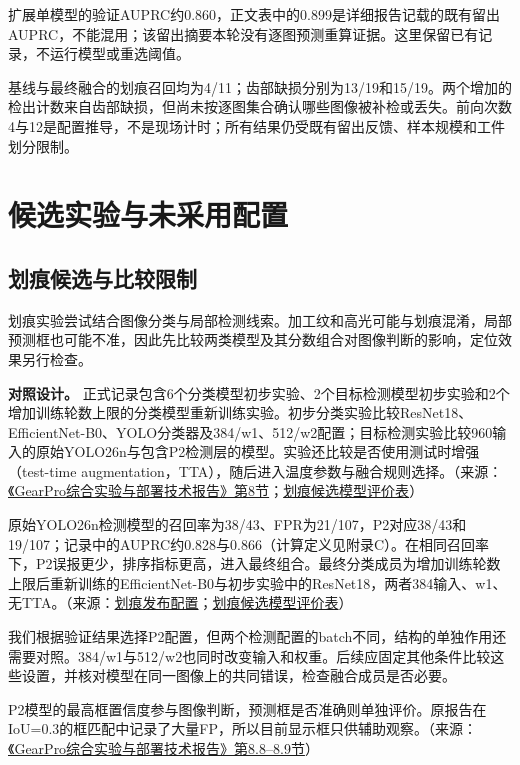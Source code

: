扩展单模型的验证AUPRC约0.860，正文表中的0.899是详细报告记载的既有留出AUPRC，不能混用；该留出摘要本轮没有逐图预测重算证据。这里保留已有记录，不运行模型或重选阈值。

基线与最终融合的划痕召回均为4/11；齿部缺损分别为13/19和15/19。两个增加的检出计数来自齿部缺损，但尚未按逐图集合确认哪些图像被补检或丢失。前向次数4与12是配置推导，不是现场计时；所有结果仍受既有留出反馈、样本规模和工件划分限制。


\FloatBarrier{}\section{候选实验与未采用配置}
\FloatBarrier{}\subsection{划痕候选与比较限制}
划痕实验尝试结合图像分类与局部检测线索。加工纹和高光可能与划痕混淆，局部预测框也可能不准，因此先比较两类模型及其分数组合对图像判断的影响，定位效果另行检查。

\textbf{对照设计。} 正式记录包含6个分类模型初步实验、2个目标检测模型初步实验和2个增加训练轮数上限的分类模型重新训练实验。初步分类实验比较ResNet18、EfficientNet-B0、YOLO分类器及384/w1、512/w2配置；目标检测实验比较960输入的原始YOLO26n与包含P2检测层的模型。实验还比较是否使用测试时增强（test-time augmentation，TTA），随后进入温度参数与融合规则选择。（来源：\protect\href{run:../../GearPro_综合技术报告_Markdown含配图/GearPro_综合实验与部署技术报告.md}{《GearPro综合实验与部署技术报告》第8节}；\protect\hyperlink{source-7}{划痕候选模型评价表}）

原始YOLO26n检测模型的召回率为38/43、FPR为21/107，P2对应38/43和19/107；记录中的AUPRC约0.828与0.866（计算定义见附录C）。在相同召回率下，P2误报更少，排序指标更高，进入最终组合。最终分类成员为增加训练轮数上限后重新训练的EfficientNet-B0与初步实验中的ResNet18，两者384输入、w1、无TTA。（来源：\protect\hyperlink{source-1}{划痕发布配置}；\protect\hyperlink{source-7}{划痕候选模型评价表}）

我们根据验证结果选择P2配置，但两个检测配置的batch不同，结构的单独作用还需要对照。384/w1与512/w2也同时改变输入和权重。后续应固定其他条件比较这些设置，并核对模型在同一图像上的共同错误，检查融合成员是否必要。

P2模型的最高框置信度参与图像判断，预测框是否准确则单独评价。原报告在IoU=0.3的框匹配中记录了大量FP，所以目前显示框只供辅助观察。（来源：\protect\href{run:../../GearPro_综合技术报告_Markdown含配图/GearPro_综合实验与部署技术报告.md}{《GearPro综合实验与部署技术报告》第8.8--8.9节}）

